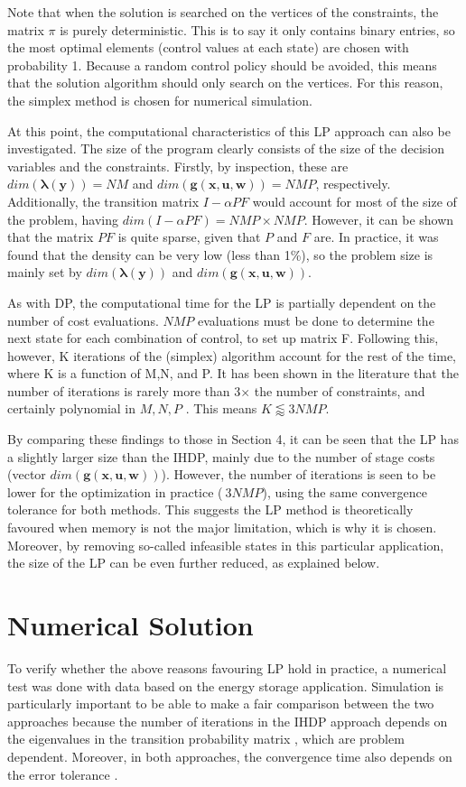 \documentclass[conference]{IEEEtran}
\begin{document}
Note that when the solution is searched on the vertices of the constraints, the matrix $\pi$ is purely deterministic\cite{MDPs}. This is to say it only contains binary entries, so the most optimal elements (control values at each state) are chosen with probability 1. Because a random control policy should be avoided, this means that the solution algorithm should only search on the vertices. For this reason, the simplex method is chosen for numerical simulation.

At this point, the computational characteristics of this LP approach can also be investigated. The size of the program clearly consists of the size of the decision variables and the constraints. Firstly, by inspection, these are $dim(\boldsymbol{\lambda(y)})=NM$ and $dim(\boldsymbol{g(x,u,w)})=NMP$, respectively. Additionally, the transition matrix $I-\alpha PF$ would account for most of the size of the problem, having $dim(I-\alpha PF) = NMP\times NMP$. However, it can be shown that the matrix $PF$ is quite sparse, given that $P$ and $F$ are. In practice, it was found that the density can be very low (less than 1\%), so the problem size is mainly set by $dim(\boldsymbol{\lambda(y)})$ and $dim(\boldsymbol{g(x,u,w)})$.

As with DP, the computational time for the LP is partially dependent on the number of cost evaluations. $NMP$ evaluations must be done to determine the next state for each combination of control, to set up matrix F. Following this, however, K iterations of the (simplex) algorithm account for the rest of the time, where K is a function of M,N, and P. It has been shown in the literature that the number of iterations is rarely more than 3$\times$ the number of constraints, and certainly polynomial in $M,N,P$ \cite{MDPs}. This means $K\lessapprox3NMP$.

By comparing these findings to those in Section 4, it can be seen that the LP has a slightly larger size than the IHDP, mainly due to the number of stage costs (vector $dim(\boldsymbol{g(x,u,w)})$). However, the number of iterations is seen to be lower for the optimization in practice ($~3NMP$), using the same convergence tolerance for both methods. This suggests the LP method is theoretically favoured when memory is not the major limitation, which is why it is chosen. Moreover, by removing so-called infeasible states in this particular application, the size of the LP can be even further reduced, as explained below.

\section{Numerical Solution}
To verify whether the above reasons favouring LP hold in practice, a numerical test was done with data based on the energy storage application. Simulation is particularly important to be able to make a fair comparison between the two approaches because the number of iterations in the IHDP approach depends on the eigenvalues in the transition probability matrix \cite{bertsekas1995dynamic}, which are problem dependent. Moreover, in both approaches, the convergence time also depends on the error tolerance \cite{bertsekas1995dynamic}.
\end{document}
